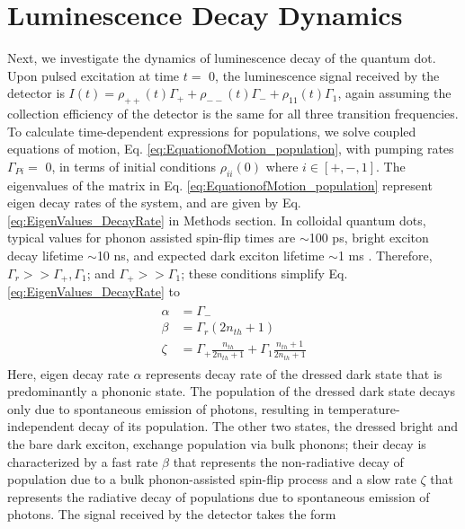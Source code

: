 \documentclass[aps,pra,preprint,groupedaddress]{revtex4-1}
\begin{document}
\section*{Luminescence Decay Dynamics}
Next, we investigate the dynamics of luminescence decay of the quantum dot. Upon pulsed excitation at time $t =$ 0, the luminescence signal received by the detector \cite{Labeau2003, Biadala2016} is $I(t) = \rho_{++}(t)\Gamma_+ + \rho_{--}(t)\Gamma_- + \rho_{11}(t)\Gamma_1$, again assuming the collection efficiency of the detector is the same for all three transition frequencies. To calculate time-dependent expressions for populations, we solve coupled equations of motion, Eq. \ref{eq:EquationofMotion_population}, with pumping rates $\Gamma_{Pi} =$ 0, in terms of initial conditions $\rho_{ii}(0)$ where $i\in[+,-,1]$. The eigenvalues of the matrix in Eq. \ref{eq:EquationofMotion_population} represent eigen decay rates of the system, and are given by Eq. \ref{eq:EigenValues_DecayRate} in Methods section. In colloidal quantum dots, typical values for phonon assisted spin-flip times are $\sim$100 ps, bright exciton decay lifetime $\sim$10 ns, and expected dark exciton lifetime $\sim$1 ms \cite{Labeau2003,Biadala2009, Califano2005,Masia2012}. Therefore, $\Gamma_r >> \Gamma_+, \Gamma_1$; and $\Gamma_+ >> \Gamma_1$; these conditions simplify Eq. \ref{eq:EigenValues_DecayRate} to
\begin{eqnarray}
\begin{aligned}
\label{eq:EigenValues_DecayRate_simplified}
\alpha &=\Gamma_- \\
\beta &= \Gamma_r(2n_{th}+1)\\
\zeta &= \Gamma_+\frac{n_{th}}{2n_{th}+1} + \Gamma_1\frac{n_{th}+1}{2n_{th}+1}
\end{aligned}
\end{eqnarray}
Here, eigen decay rate $\alpha$ represents decay rate of the dressed dark state that is predominantly a phononic state. The population of the dressed dark state decays only due to spontaneous emission of photons, resulting in temperature-independent decay of its population. The other two states, the dressed bright and the bare dark exciton, exchange population via bulk phonons; their decay is characterized by a fast rate $\beta$ that represents the non-radiative decay of population due to a bulk phonon-assisted spin-flip process and a slow rate $\zeta$ that represents the radiative decay of populations due to spontaneous emission of photons. The signal received by the detector takes the form
\end{document}
